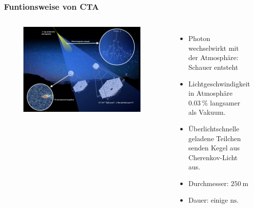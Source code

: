 \documentclass[aspectratio=1610, professionalfonts, 9pt]{beamer}
\begin{document}
  \begin{frame}
    \frametitle{Funtionsweise von CTA}
    \begin{columns}
        \begin{figure}
          \includegraphics[width=0.95\textwidth]{pictures/CTA.png}
          \caption{\cite{CTA}}
          \label{abb:CTA}
        \end{figure}
        \begin{itemize}
          \item Photon wechselwirkt mit der Atmosphäre: Schauer entsteht
          \item Lichtgeschwindigkeit in Atmosphäre $\SI{0.03}{\percent}$ langsamer als Vakuum.
          \item Überlichtschnelle geladene Teilchen senden Kegel aus Cherenkov-Licht aus.
          \item Durchmesser: $\SI{250}{\m}$
          \item Dauer: einige $\si{\nano\s}$.
        \end{itemize}
    \end{columns}
  \end{frame}
\end{document}
